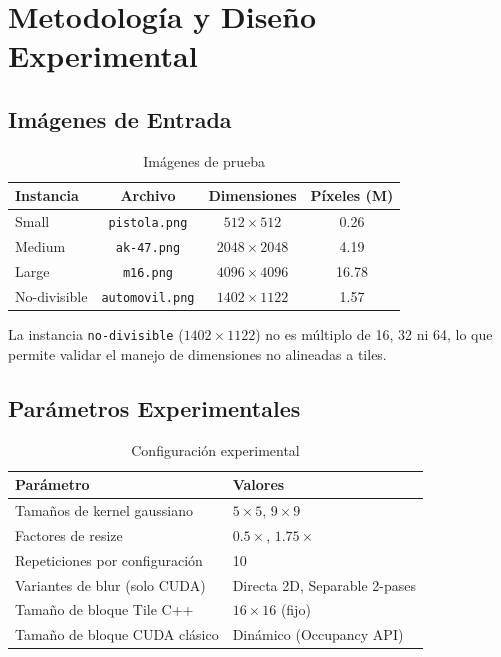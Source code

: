 \documentclass[12pt,a4paper]{article}
\begin{document}
\section{Metodolog\'ia y Dise\~no Experimental}

\subsection{Im\'agenes de Entrada}

\begin{table}[H]
\centering
\caption{Im\'agenes de prueba}
\begin{tabular}{lccc}
\toprule
\textbf{Instancia} & \textbf{Archivo} & \textbf{Dimensiones} & \textbf{P\'ixeles (M)} \\
\midrule
Small & \texttt{pistola.png} & $512 \times 512$ & 0.26 \\
Medium & \texttt{ak-47.png}  & $2048 \times 2048$ & 4.19 \\
Large & \texttt{m16.png}    & $4096 \times 4096$ & 16.78 \\
No-divisible & \texttt{automovil.png} & $1402 \times 1122$ & 1.57 \\
\bottomrule
\end{tabular}
\end{table}

La instancia \texttt{no-divisible} ($1402 \times 1122$) no es m\'ultiplo de 16, 32 ni 64, lo que permite validar el manejo de dimensiones no alineadas a tiles.

\subsection{Par\'ametros Experimentales}

\begin{table}[H]
\centering
\caption{Configuraci\'on experimental}
\begin{tabular}{ll}
\toprule
\textbf{Par\'ametro} & \textbf{Valores} \\
\midrule
Tama\~nos de kernel gaussiano & $5 \times 5$, $9 \times 9$ \\
Factores de resize & $0.5\times$, $1.75\times$ \\
Repeticiones por configuraci\'on & 10 \\
Variantes de blur (solo CUDA) & Directa 2D, Separable 2-pases \\
Tama\~no de bloque Tile C++ & $16 \times 16$ (fijo) \\
Tama\~no de bloque CUDA cl\'asico & Din\'amico (Occupancy API) \\
\bottomrule
\end{tabular}
\end{table}
\end{document}

